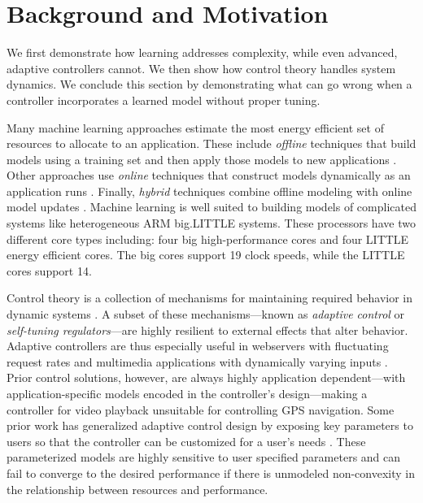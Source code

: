 \section{Background and Motivation}
\label{sec:example}

We first demonstrate how learning addresses complexity, while even
advanced, adaptive controllers cannot.  We then show how control
theory handles system dynamics.  We conclude this section by
demonstrating what can go wrong when a controller incorporates a
learned model without proper tuning.

Many machine learning approaches estimate the most energy efficient
set of resources to allocate to an application.  These include
\emph{offline} techniques that build models using a training set and
then apply those models to new applications
\cite{Yi2003,LeeBrooks2006,CPR,ChenJohn2011,reddiHPCA2013,Paragon,PUPiL}.
Other approaches use \emph{online} techniques that construct models
dynamically as an application runs
\cite{Li2006,Flicker,ParallelismDial,Ponamarev,LeeBrooks}.  Finally,
\emph{hybrid} techniques combine offline modeling with online model
updates \cite{Zhang2012,packandcap,Winter2010,dubach2010,Koala,Cinder,
  wu2012inferred,LEO}.  Machine learning is well suited to building
models of complicated systems like heterogeneous ARM big.LITTLE
systems.  These processors have two different core types including:
four big high-performance cores and four LITTLE energy efficient
cores.  The big cores support 19 clock speeds, while the LITTLE cores
support 14.

Control theory is a collection of mechanisms for maintaining required
behavior in dynamic systems \cite{Hellerstein2004a}. A subset of these
mechanisms---known as \emph{adaptive control} or \emph{self-tuning
  regulators}---are highly resilient to external effects that alter
behavior.  Adaptive controllers are thus especially useful in
webservers with fluctuating request rates
\cite{Horvarth,LuEtAl-2006a,SunDaiPan-2008a} and multimedia
applications with dynamically varying inputs
\cite{TCST,Agilos,grace2}.  Prior control solutions, however, are
always highly application dependent---with application-specific models
encoded in the controller's design---making a controller for video
playback unsuitable for controlling GPS navigation.  Some prior work
has generalized adaptive control design by exposing key parameters to
users so that the controller can be customized for a user's needs
\cite{ControlWare,POET}.  These parameterized models are highly
sensitive to user specified parameters and can fail to converge to the
desired performance if there is unmodeled non-convexity in the
relationship between resources and performance.  

